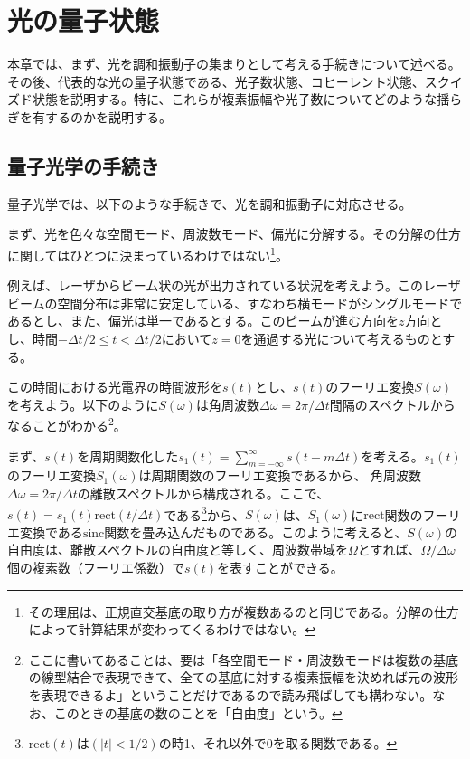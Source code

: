 \chapter{光の量子状態}

本章では、まず、光を調和振動子の集まりとして考える手続きについて述べる。その後、代表的な光の量子状態である、光子数状態、コヒーレント状態、スクイズド状態を説明する。特に、これらが複素振幅や光子数についてどのような揺らぎを有するのかを説明する。

\section{量子光学の手続き}
量子光学では、以下のような手続きで、光を調和振動子に対応させる。

まず、光を色々な空間モード、周波数モード、偏光に分解する。その分解の仕方に関してはひとつに決まっているわけではない\footnote{その理屈は、正規直交基底の取り方が複数あるのと同じである。分解の仕方によって計算結果が変わってくるわけではない。}。

例えば、レーザからビーム状の光が出力されている状況を考えよう。このレーザビームの空間分布は非常に安定している、すなわち横モードがシングルモードであるとし、また、偏光は単一であるとする。このビームが進む方向を$z$方向とし、時間$-\Delta t/2 \leq t < \Delta t/2$において$z = 0$を通過する光について考えるものとする。

この時間における光電界の時間波形を$s(t)$とし、$s(t)$のフーリエ変換$S(\omega)$を考えよう。以下のように$S(\omega)$は角周波数$\Delta \omega = 2\pi / \Delta t$間隔のスペクトルからなることがわかる\footnote{ここに書いてあることは、要は「各空間モード・周波数モードは複数の基底の線型結合で表現できて、全ての基底に対する複素振幅を決めれば元の波形を表現できるよ」ということだけであるので読み飛ばしても構わない。なお、このときの基底の数のことを「自由度」という。}。

まず、$s(t)$を周期関数化した$s_1(t) = \sum_{m = -\infty}^{\infty}s(t-m\Delta t)$を考える。$s_1(t)$のフーリエ変換$S_1(\omega)$は周期関数のフーリエ変換であるから、
角周波数$\Delta \omega = 2\pi/\Delta t$の離散スペクトルから構成される。ここで、$s(t) = s_1(t)\mathrm{rect}(t / \Delta t)$である\footnote{$\mathrm{rect}(t)$は$(|t|<1/2)$の時1、それ以外で0を取る関数である。}から、$S(\omega)$は、$S_1(\omega)$に$\mathrm{rect}$関数のフーリエ変換である$\mathrm {sinc}$関数を畳み込んだものである。このように考えると、$S(\omega)$の自由度は、離散スペクトルの自由度と等しく、周波数帯域を$\Omega$とすれば、$\Omega/\Delta\omega$個の複素数（フーリエ係数）で$s(t)$を表すことができる。

